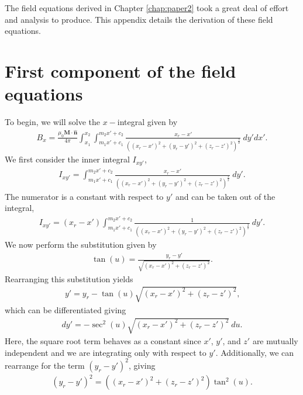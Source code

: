The field equations derived in Chapter \ref{chap:paper2} took a great deal of effort and analysis to produce. This appendix details the derivation of these field equations.

\section{First component of the field equations}
To begin, we will solve the \(x-\)integral given by
\begin{align}
    B_x = \frac{\mu_0 \mathbf{M}\cdot\hat{\mathbf{n}}}{4\pi} \int_{x_1}^{x_2} \int_{m_1x'+c_1}^{m_2x'+c_2} \frac{x_r-x'}{\left(\left(x_r-x'\right)^2+\left(y_r-y'\right)^2+\left(z_r-z'\right)^2\right)^\frac{3}{2}}\ dy' dx' \text{.}
\end{align}
We first consider the inner integral \(I_{xy'}\),
\begin{align}
    I_{xy'} = \int_{m_1x'+c_1}^{m_2x'+c_2} \frac{x_r-x'}{\left(\left(x_r-x'\right)^2+\left(y_r-y'\right)^2+\left(z_r-z'\right)^2\right)^\frac{3}{2}}\ dy' \text{.}
\end{align}
The numerator is a constant with respect to \(y'\) and can be taken out of the integral,
\begin{align}\label{eqn:Ixydash}
    I_{xy'} = \left(x_r-x'\right)\int_{m_1x'+c_1}^{m_2x'+c_2} \frac{1}{\left(\left(x_r-x'\right)^2+\left(y_r-y'\right)^2+\left(z_r-z'\right)^2\right)^\frac{3}{2}}\ dy' \text{.}
\end{align}
We now perform the substitution given by
\begin{align}
    \tan\left(u\right) = \frac{y_r-y'}{\sqrt{\left(x_r-x'\right)^2+\left(z_r-z'\right)^2}} \text{.}
\end{align}
Rearranging this substitution yields
\begin{align}
    y' = y_r - \tan\left(u\right)\sqrt{\left(x_r-x'\right)^2+\left(z_r-z'\right)^2} \text{,}
\end{align}
which can be differentiated giving
\begin{align}\label{eqn:dydash}
    dy' = -\sec^2\left(u\right)\sqrt{\left(x_r-x'\right)^2+\left(z_r-z'\right)^2}\ du \text{.}
\end{align}
Here, the square root term behaves as a constant since \(x'\), \(y'\), and \(z'\) are mutually independent and we are integrating only with respect to \(y'\). Additionally, we can rearrange for the term \(\left(y_r-y'\right)^2\), giving
\begin{align}\label{eqn:yminusydashsquared}
    \left(y_r-y'\right)^2 = \left(\left(x_r-x'\right)^2+\left(z_r-z'\right)^2\right)\tan^2\left(u\right) \text{.}
\end{align}
